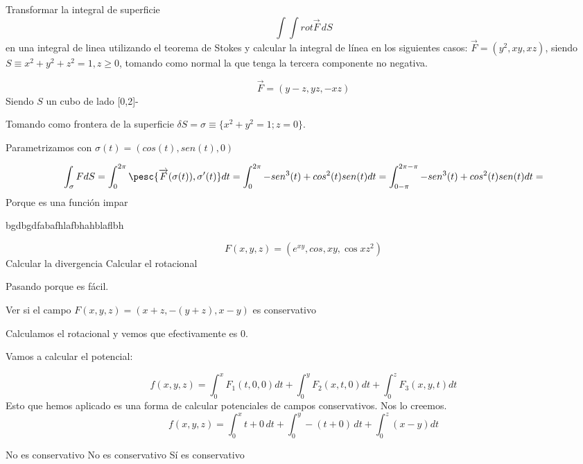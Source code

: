 \begin{problem}[20]
Transformar la integral de superficie \[\int\int rot\overrightarrow{F}\,dS\]
en una integral de linea utilizando el teorema de Stokes y calcular la integral de línea en los siguientes casos:
\ppart
$\overrightarrow{F} = (y^2,xy,xz)$, siendo $S \equiv x^2+y^2+z^2=1, z\geq 0$, tomando como normal la que tenga la tercera componente no negativa.

\ppart
 \[\overrightarrow{F} = (y-z,yz,-xz)\]
 Siendo $S$ un cubo de lado [0,2]-
\solution

\spart
Tomando como frontera de la superficie $\delta S = \sigma \equiv\{ x^2+y^2=1; z=0\}$.

Parametrizamos con $\sigma(t) = (cos(t),sen(t),0)$

\[
\int_{\sigma} FdS = \int_0^{2\pi}
\pesc{ \overrightarrow{F}(\sigma(t)), \sigma'(t)} dt = \int_0^{2\pi} -sen^3(t) + cos^2(t)sen(t) dt = \int_{0-\pi}^{2\pi-\pi} -sen^3(t) + cos^2(t)sen(t) dt = 
\]
Porque es una función impar

\spart

bgdbgdfabafhlafbhahblaflbh

\end{problem}



\begin{problem}[18]
\[F(x,y,z) = \left(e^{xy},cos
,xy,\cos xz^2\right)\]
\ppart Calcular la divergencia
\ppart Calcular el rotacional
\solution

Pasando porque es fácil.

\end{problem}

\begin{problem}[19]

\ppart Ver si el campo  $ F(x,y,z) = (x+z,-(y+z),x-y)$ es conservativo
\ppart 
\ppart
\ppart 

\solution

\spart Calculamos el rotacional y vemos que efectivamente es 0.

Vamos a calcular el potencial:

\[f(x,y,z) = \int_0^x F_1(t,0,0)dt + \int_0^y F_2(x,t,0)dt + \int_0^z F_3(x,y,t)dt \]
Esto que hemos aplicado es una forma de calcular potenciales de campos conservativos. Nos lo creemos.
\[f(x,y,z) = \int_0^x t+0 \,dt + \int_0^y -(t+0)\,dt + \int_0^z (x-y)dt\]

\spart No es conservativo
\spart No es conservativo
\spart Sí es conservativo

\end{problem}

